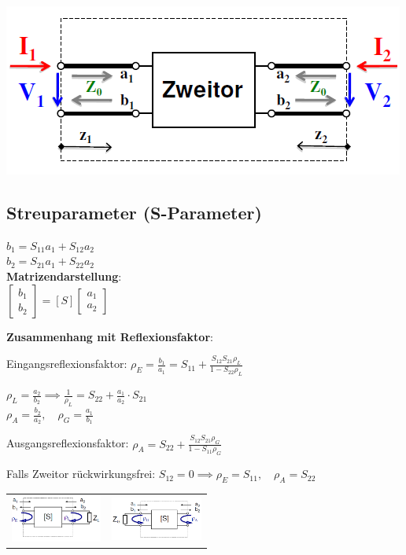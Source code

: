 \documentclass[english]{latex4ei/latex4ei_sheet}
\begin{document}
\begin{sectionbox}
\includegraphics[width = \columnwidth]{./img/zweitor_amplituden.png}
\end{sectionbox}
\begin{sectionbox}
	\subsection{Streuparameter (S-Parameter)}
	$b_1 = S_{11} a_1 + S_{12} a_2$\\
	$b_2 = S_{21} a_1 + S_{22} a_2$\\
	\textbf{Matrizendarstellung}:\\
	$\begin{bmatrix}
		b_1 \\
		b_2
	\end{bmatrix}
	= [S] \begin{bmatrix}
		a_1\\
		a_2
	\end{bmatrix}$
	
	\textbf{Zusammenhang mit Reflexionsfaktor}:\\
	\begin{emphbox}
	Eingangsreflexionsfaktor: $\rho_E = \frac{b_1}{a_1} = S_{11} + \frac{S_{12}S_{21}\rho_L}{1-S_{22}\rho_L}$
	\end{emphbox}

	$\rho_L = \frac{a_2}{b_2}  \implies \frac{1}{\rho_L} = S_{22} + \frac{a_1}{a_2}\cdot S_{21}$\\
	
	$\rho_A = \frac{b_2}{a_2}, \quad \rho_G = \frac{a_1}{b_1}$\\
	\begin{emphbox}
		Ausgangsreflexionsfaktor: $\rho_A = S_{22} + \frac{S_{12}S_{21}\rho_G}{1-S_{11}\rho_G}$
	\end{emphbox}
Falls Zweitor rückwirkungsfrei: $S_{12} = 0 \implies \rho_E = S_{11}, \quad \rho_A = S_{22}$\\

\begin{tabular*}{\columnwidth}{cc}
\includegraphics[width = 3cm]{./img/eingangsrefl.png} & \includegraphics[width = 3cm]{./img/ausgangsrefl.png}
\end{tabular*}
\end{sectionbox}
\end{document}
